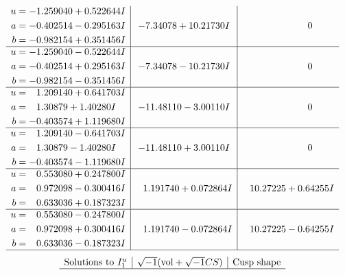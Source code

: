 \documentclass[1p]{elsarticle_modified}
\theoremstyle{definition}
\newcommand{\I}{\sqrt{-1}}
\begin{document}
$$\begin{array}{c|c|c}
\begin{aligned}
u &= -1.259040 + 0.522644 I \\
a &= -0.402514 - 0.295163 I \\
b &= -0.982154 + 0.351456 I\end{aligned}
 & -7.34078 + 10.21730 I & \phantom{-0.000000 } 0 \\ \hline\begin{aligned}
u &= -1.259040 - 0.522644 I \\
a &= -0.402514 + 0.295163 I \\
b &= -0.982154 - 0.351456 I\end{aligned}
 & -7.34078 - 10.21730 I & \phantom{-0.000000 } 0 \\ \hline\begin{aligned}
u &= \phantom{-}1.209140 + 0.641703 I \\
a &= \phantom{-}1.30879 + 1.40280 I \\
b &= -0.403574 + 1.119680 I\end{aligned}
 & -11.48110 - 3.00110 I & \phantom{-0.000000 } 0 \\ \hline\begin{aligned}
u &= \phantom{-}1.209140 - 0.641703 I \\
a &= \phantom{-}1.30879 - 1.40280 I \\
b &= -0.403574 - 1.119680 I\end{aligned}
 & -11.48110 + 3.00110 I & \phantom{-0.000000 } 0 \\ \hline\begin{aligned}
u &= \phantom{-}0.553080 + 0.247800 I \\
a &= \phantom{-}0.972098 - 0.300416 I \\
b &= \phantom{-}0.633036 + 0.187323 I\end{aligned}
 & \phantom{-}1.191740 + 0.072864 I & \phantom{-}10.27225 + 0.64255 I \\ \hline\begin{aligned}
u &= \phantom{-}0.553080 - 0.247800 I \\
a &= \phantom{-}0.972098 + 0.300416 I \\
b &= \phantom{-}0.633036 - 0.187323 I\end{aligned}
 & \phantom{-}1.191740 - 0.072864 I & \phantom{-}10.27225 - 0.64255 I\\
 \hline 
 \end{array}$$\newpage$$\begin{array}{c|c|c}  
\text{Solutions to }I^u_{1}& \I (\text{vol} + \sqrt{-1}CS) & \text{Cusp shape}\\
 \hline 

\end{array}$$
\end{document}
